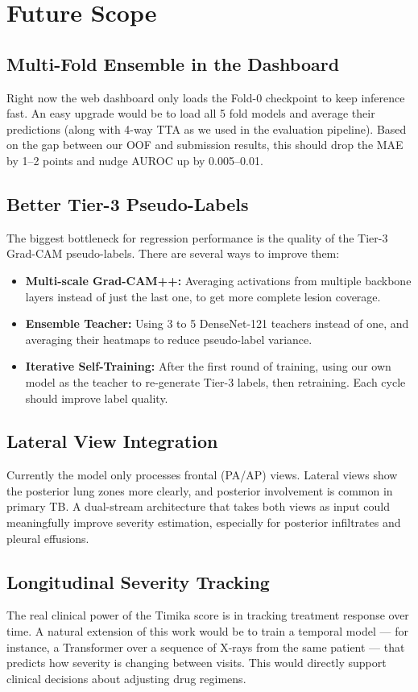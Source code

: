 \documentclass[12pt]{report}
\begin{document}
\section{Future Scope}

\subsection{Multi-Fold Ensemble in the Dashboard}
Right now the web dashboard only loads the Fold-0 checkpoint to keep inference fast. An easy upgrade would be to load all 5 fold models and average their predictions (along with 4-way TTA as we used in the evaluation pipeline). Based on the gap between our OOF and submission results, this should drop the MAE by 1--2 points and nudge AUROC up by 0.005--0.01.

\subsection{Better Tier-3 Pseudo-Labels}
The biggest bottleneck for regression performance is the quality of the Tier-3 Grad-CAM pseudo-labels. There are several ways to improve them:
\begin{itemize}
    \item \textbf{Multi-scale Grad-CAM++:} Averaging activations from multiple backbone layers instead of just the last one, to get more complete lesion coverage.
    \item \textbf{Ensemble Teacher:} Using 3 to 5 DenseNet-121 teachers instead of one, and averaging their heatmaps to reduce pseudo-label variance.
    \item \textbf{Iterative Self-Training:} After the first round of training, using our own model as the teacher to re-generate Tier-3 labels, then retraining. Each cycle should improve label quality.
\end{itemize}

\subsection{Lateral View Integration}
Currently the model only processes frontal (PA/AP) views. Lateral views show the posterior lung zones more clearly, and posterior involvement is common in primary TB. A dual-stream architecture that takes both views as input could meaningfully improve severity estimation, especially for posterior infiltrates and pleural effusions.

\subsection{Longitudinal Severity Tracking}
The real clinical power of the Timika score is in tracking treatment response over time. A natural extension of this work would be to train a temporal model --- for instance, a Transformer over a sequence of X-rays from the same patient --- that predicts how severity is changing between visits. This would directly support clinical decisions about adjusting drug regimens.
\end{document}
